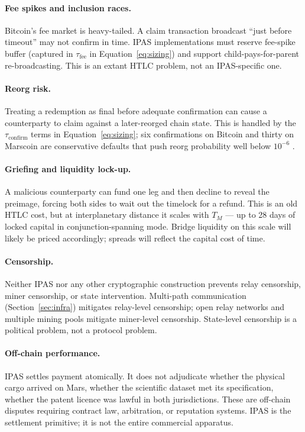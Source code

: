 \documentclass[11pt]{article}
\begin{document}
\paragraph{Fee spikes and inclusion races.} Bitcoin's fee market is heavy-tailed. A claim transaction broadcast ``just before timeout'' may not confirm in time. IPAS implementations must reserve fee-spike buffer (captured in $\tau_{\text{fee}}$ in Equation~\ref{eq:sizing}) and support child-pays-for-parent re-broadcasting. This is an extant HTLC problem, not an IPAS-specific one.

\paragraph{Reorg risk.} Treating a redemption as final before adequate confirmation can cause a counterparty to claim against a later-reorged chain state. This is handled by the $\tau_{\text{confirm}}$ terms in Equation~\ref{eq:sizing}; six confirmations on Bitcoin and thirty on Marscoin are conservative defaults that push reorg probability well below $10^{-6}$ \citep{nakamoto2008bitcoin}.

\paragraph{Griefing and liquidity lock-up.} A malicious counterparty can fund one leg and then decline to reveal the preimage, forcing both sides to wait out the timelock for a refund. This is an old HTLC cost, but at interplanetary distance it scales with $T_M$ --- up to 28 days of locked capital in conjunction-spanning mode. Bridge liquidity on this scale will likely be priced accordingly; spreads will reflect the capital cost of time.

\paragraph{Censorship.} Neither IPAS nor any other cryptographic construction prevents relay censorship, miner censorship, or state intervention. Multi-path communication (Section~\ref{sec:infra}) mitigates relay-level censorship; open relay networks and multiple mining pools mitigate miner-level censorship. State-level censorship is a political problem, not a protocol problem.

\paragraph{Off-chain performance.} IPAS settles payment atomically. It does not adjudicate whether the physical cargo arrived on Mars, whether the scientific dataset met its specification, whether the patent licence was lawful in both jurisdictions. These are off-chain disputes requiring contract law, arbitration, or reputation systems. IPAS is the settlement primitive; it is not the entire commercial apparatus.
\end{document}
